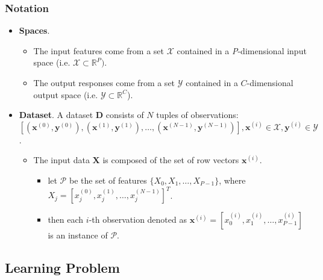 \documentclass[11pt, 
               aspectratio=169]{beamer}
\begin{document}
	\begin{frame}
	
		\frametitle{Notation}
		
			\begin{itemize}
			\item \textbf{Spaces}.  
			\begin{itemize}
				\item The input features come from a set  $\mathcal{X}$ contained in a \textit{P}-dimensional input space (i.e. $\mathcal{X} \subset \mathbb{R}^P)$.  
				\item The output responses come from a set $\mathcal{Y}$ contained in a $C$-dimensional output space (i.e. $\mathcal{Y} \subset \mathbb{R}^C$).
			\end{itemize}	
			\bigskip	
			\item \textbf{Dataset}. A dataset $\mathbf{D}$ consists of $N$ tuples of observations:\\ $[(\mathbf{x}^{(0)},\mathbf{y}^{(0)}), (\mathbf{x}^{(1)},\mathbf{y}^{(1)}), \dots, (\mathbf{x}^{(N-1)},\mathbf{y}^{(N-1)})], \mathbf{x}^{(i)} \in \mathcal{X}, \mathbf{y}^{(i)} \in \mathcal{Y}$.\\
			\begin{itemize}
				\item The input data $\mathbf{X}$ is composed of the set of row vectors $\mathbf{x}^{(i)}$. 
				\begin{itemize}
					\item let $\mathcal{P}$ be the set of features  $\{X_0, X_1, \dots, X_{P-1}\}$, where $X_j = \left[x_{j}^{(0)}, x_{j}^{(1)}, \dots, x_{j}^{(N-1)} \right]^T$.
					\item then each $i$-th observation denoted as $\mathbf{x}^{(i)} = \left[x_0^{(i)}, x_1^{(i)}, \dots, x_{P-1}^{(i)} \right]$ is an instance of $\mathcal{P}$.
				\end{itemize}
			\end{itemize}
		\end{itemize}
	
	\end{frame}

    \subsection{Learning Problem}
	
\end{document}
